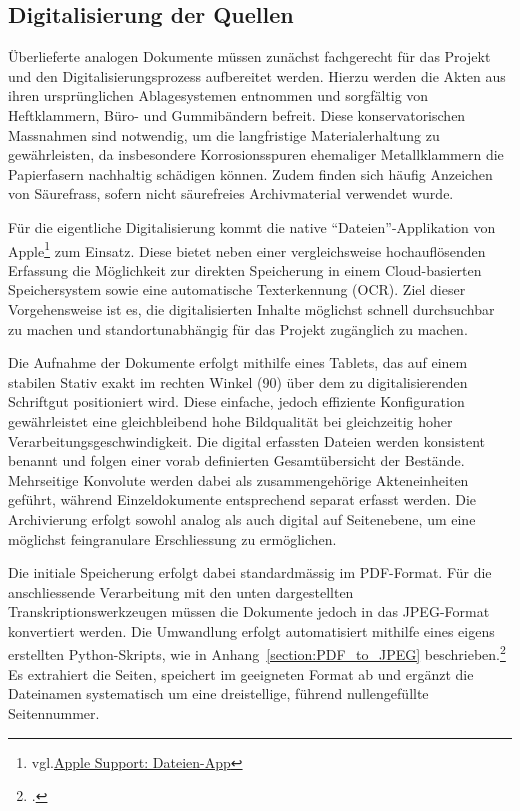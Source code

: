 \documentclass[12pt, a4paper, ngerman, bidi=default]{article}
\let\cite\footcite
\begin{document}
\subsection{Digitalisierung der Quellen}

Überlieferte analogen Dokumente müssen zunächst fachgerecht für das Projekt und den Digitalisierungsprozess aufbereitet werden. 
Hierzu werden die Akten aus ihren ursprünglichen Ablagesystemen entnommen und sorgfältig von Heftklammern, Büro- und Gummibändern 
befreit. Diese konservatorischen Massnahmen sind notwendig, um die langfristige Materialerhaltung zu gewährleisten, 
da insbesondere Korrosionsspuren ehemaliger Metallklammern die Papierfasern nachhaltig schädigen können. Zudem finden sich häufig 
Anzeichen von Säurefrass, sofern nicht säurefreies Archivmaterial verwendet wurde.

Für die eigentliche Digitalisierung kommt die native \enquote{Dateien}-Applikation von 
Apple\footnote{vgl.\href{https://support.apple.com/de-de/guide/preview/prvw28034/mac}{Apple Support: Dateien-App}} zum Einsatz. 
Diese bietet neben einer vergleichsweise hochauflösenden Erfassung die Möglichkeit zur direkten Speicherung in einem Cloud-basierten 
Speichersystem sowie eine automatische Texterkennung (OCR). Ziel dieser Vorgehensweise ist es, die digitalisierten Inhalte möglichst 
schnell durchsuchbar zu machen und standortunabhängig für das Projekt zugänglich zu machen.

Die Aufnahme der Dokumente erfolgt mithilfe eines Tablets, das auf einem stabilen Stativ exakt im rechten Winkel (90\textdegree)
über dem zu digitalisierenden Schriftgut positioniert wird. Diese einfache, jedoch effiziente Konfiguration gewährleistet eine 
gleichbleibend hohe Bildqualität bei gleichzeitig hoher Verarbeitungsgeschwindigkeit. Die digital erfassten Dateien werden konsistent
 benannt und folgen einer vorab definierten Gesamtübersicht der Bestände. Mehrseitige Konvolute werden dabei als zusammengehörige 
 Akteneinheiten geführt, während Einzeldokumente entsprechend separat erfasst werden. Die Archivierung erfolgt sowohl analog als auch 
 digital auf Seitenebene, um eine möglichst feingranulare Erschliessung zu ermöglichen.

Die initiale Speicherung erfolgt dabei standardmässig im PDF-Format. Für die anschliessende Verarbeitung mit den unten dargestellten 
Transkriptionswerkzeugen müssen die Dokumente jedoch in das JPEG-Format konvertiert werden. Die Umwandlung erfolgt automatisiert 
mithilfe eines eigens erstellten Python-Skripts, wie in Anhang~\ref{section:PDF_to_JPEG} beschrieben.\cite{burkhardt_githubpdf_to_jpegpy_2025}
Es extrahiert die Seiten, speichert im geeigneten 
Format ab und ergänzt die Dateinamen systematisch um eine dreistellige, führend nullengefüllte Seitennummer.
\end{document}
